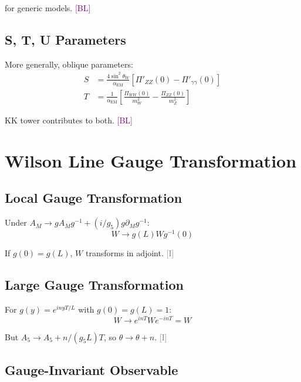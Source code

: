 \documentclass[11pt,a4paper]{article}
\newcommand{\tagI}{\textcolor{gray}{[I]}}
\newcommand{\tagBL}{\textcolor{purple}{[BL]}}
\begin{document}
for generic models. \tagBL

\subsection{S, T, U Parameters}

More generally, oblique parameters:
\begin{align}
\label{eq:S-param}
S &= \frac{4\sin^2\theta_W}{\alpha_{\text{EM}}} \left[\Pi'_{ZZ}(0) - \Pi'_{\gamma\gamma}(0)\right] \\
\label{eq:T-param}
T &= \frac{1}{\alpha_{\text{EM}}} \left[\frac{\Pi_{WW}(0)}{m_W^2} - \frac{\Pi_{ZZ}(0)}{m_Z^2}\right]
\end{align}

KK tower contributes to both. \tagBL

\appendix

\section{Wilson Line Gauge Transformation}
\label{app:wilson-gauge}

\subsection{Local Gauge Transformation}

Under $A_M \to g A_M g^{-1} + (i/g_5) g \partial_M g^{-1}$:
\begin{equation}
\label{eq:app-wilson-gauge}
W \to g(L) W g^{-1}(0)
\end{equation}

If $g(0) = g(L)$, $W$ transforms in adjoint. \tagI

\subsection{Large Gauge Transformation}

For $g(y) = e^{i n y T / L}$ with $g(0) = g(L) = 1$:
\begin{equation}
\label{eq:app-large-gauge}
W \to e^{i n T} W e^{-i n T} = W
\end{equation}

But $A_5 \to A_5 + n/(g_5 L) T$, so $\theta \to \theta + n$. \tagI

\subsection{Gauge-Invariant Observable}
\end{document}
